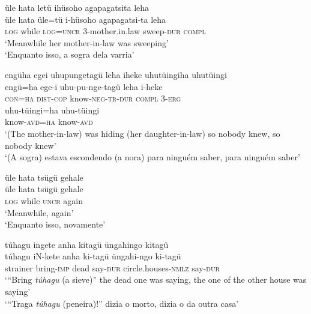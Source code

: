 \documentclass[output=paper,
modfonts,nonflat
]{langsci/langscibook}
\begin{document}
\newpage 
\ea üle hata letü ihüsoho agapagatsita leha \\[.3em]
\gll üle 	hata	üle=tü		i-hüsoho		agapagatsi-ta	leha \\
\textsc{log} 	while 	\textsc{log=uncr}	3-mother.in.law	sweep-\textsc{dur}	\textsc{compl} \\
\glt ‘Meanwhile her mother-in-law was sweeping’ \\
‘Enquanto isso, a sogra dela varria’ \\
\z

\ea engüha egei uhupungetagü leha iheke uhutüingiha uhutüingi \\[.3em]
\gll engü=ha	ege-i		uhu-pu-nge-tagü{\footnotemark}{}	 	leha	i-heke \\ 
\textsc{con=ha}	\textsc{dist-cop} 	know\textsc{-neg-tr-dur} 	\textsc{compl} \textsc{3-erg}  \\
\gll uhu-tüingi=ha		uhu-tüingi \\
know-\textsc{avd=ha} 	know\textsc{-avd} \\
\glt ‘(The mother-in-law) was hiding (her daughter-in-law) so nobody knew, so nobody knew’ \\
‘(A sogra) estava escondendo (a nora) para ninguém saber, para ninguém saber’
\z

\ea üle hata tsügü gehale \\[.3em]
\gll üle	hata 	tsügü 		gehale \\
\textsc{log} 	while 	\textsc{uncr} 	again \\
\glt ‘Meanwhile, again’ \\
‘Enquanto isso, novamente’ \\
\z

\ea túhagu{\footnotemark} ingete anha kitagü üngahingo{\footnotemark} kitagü \\[.3em]
\gll túhagu		iN-kete		anha	ki-tagü		üngahi-ngo		ki-tagü \\
strainer		bring-\textsc{imp} 	dead	say\textsc{-dur} 	circle.houses-\textsc{nmlz}	say-\textsc{dur} \\
\glt ‘“Bring \emph{túhagu} (a sieve)” the dead one was saying, the one of the other house was saying’ \\
‘“Traga \emph{túhagu} (peneira)!” dizia o morto, dizia o da outra casa’ \\
\fnminus
{}
\fnplus
{}
\z
\end{document}
